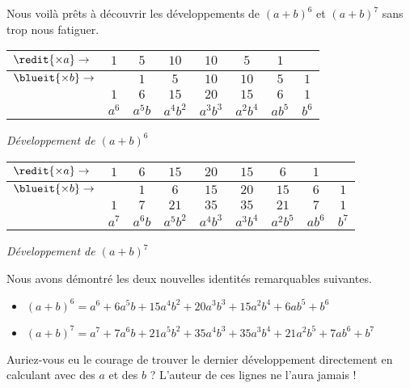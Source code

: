 \medskip

Nous voilà prêts à découvrir les développements de $(a + b)^6$ et $(a + b)^7$ sans trop nous fatiguer.


\medskip
\begin{center}
\begin{tabular}{|l*{7}{|c}|}
	\hline
	$\redit{\times a} \rightarrow$	&
		$1$    &  $5$      &  $10$       &  $10$       &  $5$        &  $1$      &
	\\ \hline\hline
	$\blueit{\times b} \rightarrow$	&
		       &  $1$      &  $5$        &  $10$       &  $10$       &  $5$      &  $1$
	\\ \hline\hline\hline\hline
		&
		$1$    &  $6$      &  $15$       &  $20$       &  $15$       &  $6$      &  $1$
	\\ \hline
	    &
		$a^6$  &  $a^5 b$  &  $a^4 b^2$  &  $a^3 b^3$  &  $a^2 b^4$  &  $a b^5$  &  $b^6$
	\\ \hline
\end{tabular}

\smallskip
\itshape\small
Développement de $(a + b)^6$
\end{center}


\medskip
\begin{center}
\begin{tabular}{|l*{8}{|c}|}
	\hline
	$\redit{\times a} \rightarrow$	&
		$1$    &  $6$      &  $15$       &  $20$       &  $15$       &  $6$      &  $1$      &
	\\ \hline\hline
	$\blueit{\times b} \rightarrow$	&
		       &  $1$    &  $6$      &  $15$       &  $20$       &  $15$       &  $6$      &  $1$
	\\ \hline\hline\hline\hline
		&
		$1$    &  $7$      &  $21$       &  $35$       &  $35$       &  $21$       &  $7$      &  $1$
	\\ \hline
	    &
		$a^7$  &  $a^6 b$  &  $a^5 b^2$  &  $a^4 b^3$  &  $a^3 b^4$    &  $a^2 b^5$  &  $a b^6$  &  $b^7$
	\\ \hline
\end{tabular}

\smallskip
\itshape\small
Développement de $(a + b)^7$
\end{center}


\medskip

Nous avons démontré les deux nouvelles identités remarquables suivantes.

\begin{itemize}[label = \small\textbullet]
	\item $(a + b)^6 = a^6 + 6 a^5 b + 15 a^4 b^2 + 20 a^3 b^3 + 15 a^2 b^4 + 6 a b^5 + b^6$

	\item $(a + b)^7 = a^7 + 7 a^6 b + 21 a^5 b^2 + 35 a^4 b^3 + 35 a^3 b^4 + 21 a^2 b^5 + 7 a b^6 + b^7$
\end{itemize}

\medskip

Auriez-vous eu le courage de trouver le dernier développement directement en calculant avec des $a$ et des $b$ ? L'auteur de ces lignes ne l'aura jamais !

